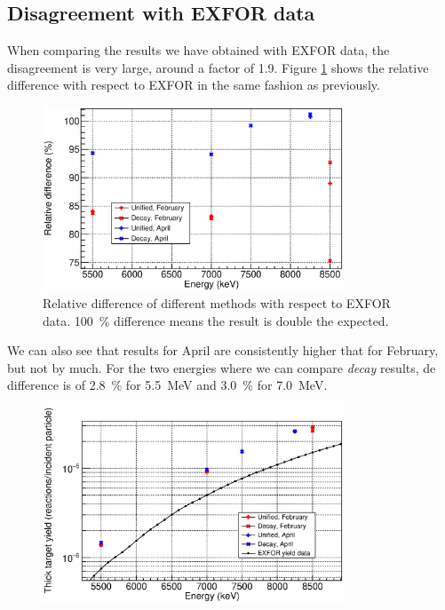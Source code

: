 \documentclass[a4paper,12pt]{report}
\begin{document}
\subsection{Disagreement with EXFOR data}
When comparing the results we have obtained with EXFOR data, the disagreement is very large, around a factor of 1.9.
Figure \ref{activation_result_diffs} shows the relative difference with respect to EXFOR in the same fashion as previously.

\begin{figure}[H]
	\centering
	\includegraphics[width=0.80\textwidth]{activation_result_diffs.eps}
	\caption{Relative difference of different methods with respect to EXFOR data.
	\qty{+100}{\percent} difference means the result is double the expected.}
	\label{activation_result_diffs}
\end{figure}

We can also see that results for April are consistently higher that for February, but not by much.
For the two energies where we can compare \textit{decay} results, de difference is of \qty{2.8}{\percent} for \qty{5.5}{\MeV} and \qty{3.0}{\percent} for \qty{7.0}{\MeV}.

\begin{figure}[H]
	\centering
	\includegraphics[width=0.80\textwidth]{activation_final_results.eps}
	\caption{}
	\label{activation_final_results}
\end{figure}
\end{document}

